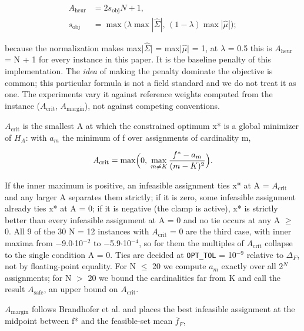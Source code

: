 \documentclass[journal]{IEEEtran}
\begin{document}
\begin{equation*}
\begin{aligned} A_{\mathrm{heur}} &= 2 s_{\mathrm{obj}} N + 1,\\ s_{\mathrm{obj}} &= \max\bigl(\lambda \max|\hat{\Sigma}|,\, (1-\lambda)\max|\hat{\mu}|\bigr);\end{aligned}
\end{equation*}


because the normalization makes max$|$$\hat{\Sigma}$$|$ = max$|$$\hat{\mu}$$|$ = 1, at $\lambda$ = 0.5 this is $A_{\mathrm{heur}}$ = N + 1 for every instance in this paper. It is the baseline penalty of this implementation. The \textit{idea} of making the penalty dominate the objective is common; this particular formula is not a field standard and we do not treat it as one. The experiments vary it against reference weights computed from the instance ($A_{\mathrm{crit}}$, $A_{\mathrm{margin}}$), not against competing conventions.


$A_{\mathrm{crit}}$ is the smallest A at which the constrained optimum x* is a global minimizer of $H_{A}$: with $a_{m}$ the minimum of f over assignments of cardinality m,


\begin{equation*}
A_{\mathrm{crit}} = \max\Bigl(0,\; \max_{m \neq K} \frac{f^{*} - a_m}{(m-K)^2}\Bigr).
\end{equation*}


If the inner maximum is positive, an infeasible assignment ties x* at A = $A_{\mathrm{crit}}$ and any larger A separates them strictly; if it is zero, some infeasible assignment already ties x* at A = 0; if it is negative (the clamp is active), x* is strictly better than every infeasible assignment at A = 0 and no tie occurs at any A $\geq$ 0. All 9 of the 30 N = 12 instances with $A_{\mathrm{crit}}$ = 0 are the third case, with inner maxima from $-$9.0$\cdot$10$^{-2}$ to $-$5.9$\cdot$10$^{-4}$, so for them the multiples of $A_{\mathrm{crit}}$ collapse to the single condition A = 0. Ties are decided at \texttt{OPT\_TOL} = 10$^{-9}$ relative to $\Delta_{F}$, not by floating-point equality. For N $\leq$ 20 we compute $a_{m}$ exactly over all 2$^{N}$ assignments; for N $>$ 20 we bound the cardinalities far from K and call the result $A_{\mathrm{safe}}$, an upper bound on $A_{\mathrm{crit}}$.


$A_{\mathrm{margin}}$ follows Brandhofer et al. \cite{ref8} and places the best infeasible assignment at the midpoint between f* and the feasible-set mean $\bar{f}_{F}$,
\end{document}
